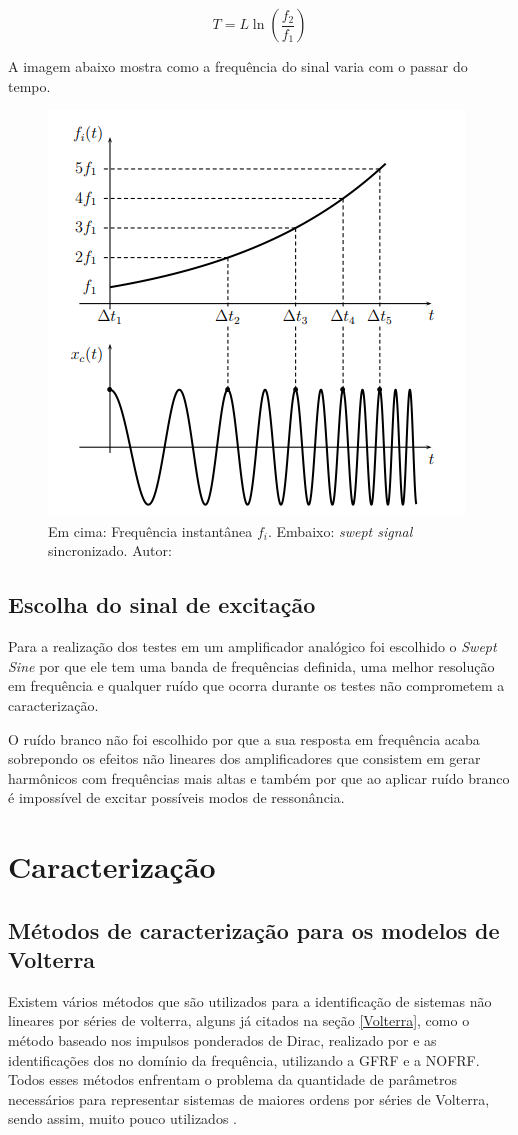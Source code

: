 \begin{equation}
T = L \ln(\dfrac{f_{2}}{f_{1}})
\label{Equação 5.10}
\end{equation}

A imagem abaixo mostra como a frequência do sinal varia com o passar do tempo.
\begin{figure}[!htb]
	\centering
	\includegraphics[width=0.6\linewidth]{figuras/SSS}
	\caption{Em cima: Frequência instantânea $f_{i}$. Embaixo: \textit{swept signal} sincronizado. Autor: \cite{novak2010chebyshev}}
	\label{fig:sss}
\end{figure}

\subsection*{Escolha do sinal de excitação}
Para a realização dos testes em um amplificador analógico foi escolhido o \textit{Swept Sine} por que ele tem uma banda de frequências definida, uma melhor resolução em frequência e qualquer ruído que ocorra durante os testes não comprometem a caracterização.

O ruído branco não foi escolhido por que a sua resposta em frequência acaba sobrepondo os efeitos não lineares dos amplificadores que consistem em gerar harmônicos com frequências mais altas e também por que ao aplicar ruído branco é impossível de excitar possíveis modos de ressonância.

\section{Caracterização}
\subsection*{Métodos de caracterização para os modelos de Volterra}
Existem vários métodos que são utilizados para a identificação de sistemas não lineares por séries de volterra, alguns já citados na seção \ref{Volterra}, como o método baseado nos impulsos ponderados de Dirac, realizado por \cite{schetzen1974theory} e as identificações dos  no domínio da frequência, utilizando a GFRF e a NOFRF. Todos esses métodos enfrentam o problema da quantidade de parâmetros necessários para representar sistemas de maiores ordens por séries de Volterra, sendo assim, muito pouco utilizados \cite{novakdissertation}.

